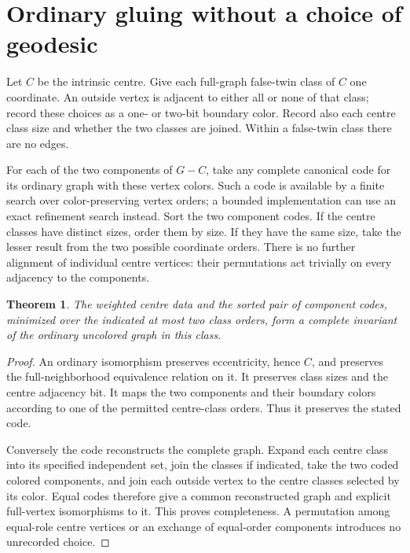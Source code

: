 \documentclass[11pt]{article}
\newtheorem{theorem}{Theorem}
\begin{document}
\section{Ordinary gluing without a choice of geodesic}

Let $C$ be the intrinsic centre. Give each full-graph false-twin class
of $C$ one coordinate. An outside vertex is adjacent to either all or
none of that class; record these choices as a one- or two-bit boundary
color. Record also each centre class size and whether the two classes
are joined. Within a false-twin class there are no edges.

For each of the two components of $G-C$, take any complete canonical
code for its ordinary graph with these vertex colors. Such a code is
available by a finite search over color-preserving vertex orders; a
bounded implementation can use an exact refinement search instead.
Sort the two component codes. If the centre classes have distinct
sizes, order them by size. If they have the same size, take the lesser
result from the two possible coordinate orders. There is no further
alignment of individual centre vertices: their permutations act trivially
on every adjacency to the components.

\begin{theorem}\label{canonical}
The weighted centre data and the sorted pair of component codes,
minimized over the indicated at most two class orders, form a complete
invariant of the ordinary uncolored graph in this class.
\end{theorem}
\begin{proof}
An ordinary isomorphism preserves eccentricity, hence $C$, and preserves
the full-neighborhood equivalence relation on it. It preserves class
sizes and the centre adjacency bit. It maps the two components and
their boundary colors according to one of the permitted centre-class
orders. Thus it preserves the stated code.

Conversely the code reconstructs the complete graph. Expand each centre
class into its specified independent set, join the classes if indicated,
take the two coded colored components, and join each outside vertex to
the centre classes selected by its color. Equal codes therefore give a
common reconstructed graph and explicit full-vertex isomorphisms to it.
This proves completeness. A permutation among equal-role centre vertices
or an exchange of equal-order components introduces no unrecorded choice.
\end{proof}
\end{document}
